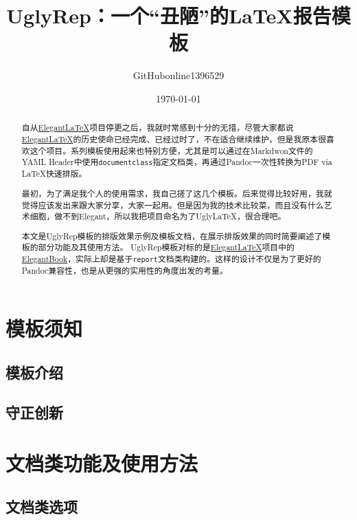 \documentclass[12pt, green]{uglyrep}
\title{\bfseries UglyRep：一个“丑陋”的\LaTeX{}报告模板}
\author{GitHubonline1396529}
\date{\today}
\begin{document}
\maketitle
\begin{abstract}
  自从\href{https://github.com/ElegantLaTeX/}{Elegant\LaTeX}项目停更之后，我就时常感到十分的无措，尽管大家都说\href{https://github.com/ElegantLaTeX/}{Elegant\LaTeX}的历史使命已经完成、已经过时了，不在适合继续维护，但是我原本很喜欢这个项目。系列模板使用起来也特别方便，尤其是可以通过在Markdwon文件的YAML Header中使用\texttt{documentclass}指定文档类，再通过Pandoc一次性转换为PDF via \LaTeX{}快速排版。

  最初，为了满足我个人的使用需求，我自己搓了这几个模板。后来觉得比较好用，我就觉得应该发出来跟大家分享，大家一起用。但是因为我的技术比较菜，而且没有什么艺术细胞，做不到Elegant，所以我把项目命名为了Ugly\LaTeX{}，很合理吧。

  本文是UglyRep模板的排版效果示例及模板文档，在展示排版效果的同时简要阐述了模板的部分功能及其使用方法。%
  UglyRep模板对标的是\href{https://github.com/ElegantLaTeX/}{Elegant\LaTeX}项目中的\href{https://github.com/ElegantLaTeX/ElegantBook}{ElegantBook}，实际上却是基于\texttt{report}文档类构建的。这样的设计不仅是为了更好的Pandoc兼容性，也是从更强的实用性的角度出发的考量。

\end{abstract}

\tableofcontents

\chapter{模板须知}
\section{模板介绍}


\section{守正创新}


\chapter{文档类功能及使用方法}
\section{文档类选项}\label{ssec:classoptions}
\end{document}
